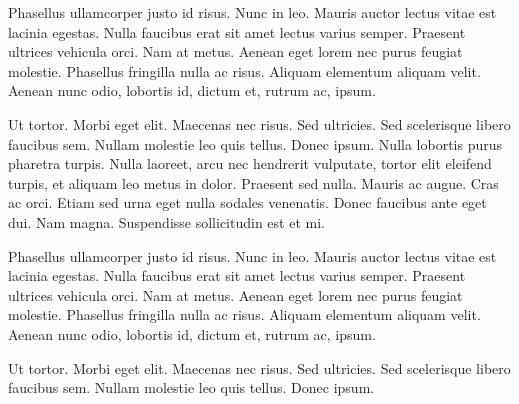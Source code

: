 Phasellus ullamcorper justo id risus. Nunc in leo. Mauris auctor
lectus vitae est lacinia egestas. Nulla faucibus erat sit amet lectus
varius semper. Praesent ultrices vehicula orci. Nam at metus. Aenean
eget lorem nec purus feugiat molestie. Phasellus fringilla nulla ac
risus. Aliquam elementum aliquam velit. Aenean nunc odio, lobortis id,
dictum et, rutrum ac, ipsum.

Ut tortor. Morbi eget elit. Maecenas nec risus. Sed ultricies. Sed
scelerisque libero faucibus sem. Nullam molestie leo quis
tellus. Donec ipsum. Nulla lobortis purus pharetra turpis. Nulla
laoreet, arcu nec hendrerit vulputate, tortor elit eleifend turpis, et
aliquam leo metus in dolor. Praesent sed nulla. Mauris ac augue. Cras
ac orci. Etiam sed urna eget nulla sodales venenatis. Donec faucibus
ante eget dui. Nam magna. Suspendisse sollicitudin est et mi.

Phasellus ullamcorper justo id risus. Nunc in leo. Mauris auctor
lectus vitae est lacinia egestas. Nulla faucibus erat sit amet lectus
varius semper. Praesent ultrices vehicula orci. Nam at metus. Aenean
eget lorem nec purus feugiat molestie. Phasellus fringilla nulla ac
risus. Aliquam elementum aliquam velit. Aenean nunc odio, lobortis id,
dictum et, rutrum ac, ipsum.

Ut tortor. Morbi eget elit. Maecenas nec risus. Sed ultricies. Sed
scelerisque libero faucibus sem. Nullam molestie leo quis
tellus. Donec ipsum.
